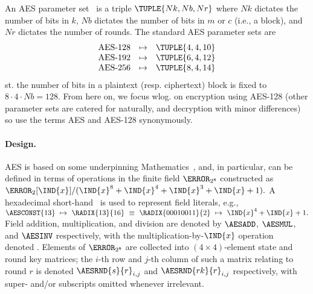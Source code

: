 An AES parameter set~\cite[Figure 4]{FIPS:197}
is a triple
$
\TUPLE{ Nk, Nb, Nr }
$
where 
$Nk$ dictates the number of bits in $k$,
$Nb$ dictates the number of bits in $m$ or $c$ (i.e., a block),
and
$Nr$ dictates the number of rounds.  The standard AES parameter sets are
\[
\begin{array}{lcl}
\mbox{AES-128} &\mapsto& \TUPLE{ 4, 4, 10 } \\
\mbox{AES-192} &\mapsto& \TUPLE{ 6, 4, 12 } \\
\mbox{AES-256} &\mapsto& \TUPLE{ 8, 4, 14 } \\
\end{array}
\]
st. the number of bits in a plaintext (resp. ciphertext) block is fixed to 
$
8 \cdot 4 \cdot Nb = 128 .
$
From here on, we focus wlog. on encryption using AES-128 (other parameter 
sets are catered for naturally, and decryption with minor differences) so
use the terms AES and AES-128 synonymously.


\paragraph{Design.}

AES is based on some underpinning Mathematics~\cite[Section 4]{FIPS:197},
and, in particular, can be defined in terms of 
operations in the finite field $\F_{2^{  8}}$ constructed as
$
\F_{2}[\IND{x}] / ( \IND{x}^{8} + \IND{x}^{4} + \IND{x}^{3} + \IND{x} + 1 ) .
$
A hexadecimal short-hand~\cite[Section 3.2]{FIPS:197} is used to represent 
field literals, e.g.,
$
\AESCONST{13} ~\mapsto~ \RADIX{13}{16} ~\equiv~ \RADIX{00010011}{2} ~\mapsto~ \IND{x}^4 + \IND{x} + 1 .
$
Field 
      addition, 
multiplication, 
and  
      division
are denoted by
$\AESADD$,
$\AESMUL$,
and
$\AESINV$
respectively,
with the multiplication-by-$\IND{x}$ operation~\cite[Section 4.2.1]{FIPS:197} 
denoted .
Elements of $\F_{2^8}$ are collected into $( 4 \times 4 )$-element state
and round key matrices; the $i$-th row and $j$-th column of such a matrix 
relating to round $r$ is denoted
$\AESRND {s}{r}_{i,j}$
and
$\AESRND{rk}{r}_{i,j}$
respectively, with super- and/or subscripts omitted whenever irrelevant.

